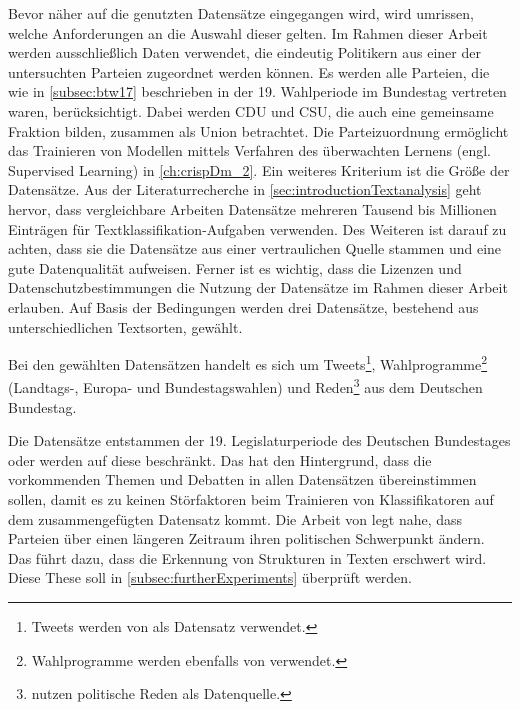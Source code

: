 Bevor näher auf die genutzten Datensätze eingegangen wird, wird umrissen, welche Anforderungen an die Auswahl dieser gelten. Im Rahmen dieser Arbeit werden ausschließlich Daten verwendet, die eindeutig Politikern aus einer der untersuchten Parteien zugeordnet werden können. Es werden alle Parteien, die wie in \autoref{subsec:btw17} beschrieben in der \num{19}. Wahlperiode im Bundestag vertreten waren, berücksichtigt. Dabei werden \ac{CDU} und \ac{CSU}, die auch eine gemeinsame Fraktion bilden, zusammen als Union betrachtet. Die Parteizuordnung ermöglicht das Trainieren von Modellen mittels Verfahren des überwachten Lernens (engl. Supervised Learning) in \autoref{ch:crispDm_2}. Ein weiteres Kriterium ist die Größe der Datensätze. Aus der Literaturrecherche in \autoref{sec:introductionTextanalysis} geht hervor, dass vergleichbare Arbeiten Datensätze mehreren Tausend bis Millionen Einträgen für Textklassifikation-Aufgaben verwenden. Des Weiteren ist darauf zu achten, dass sie die Datensätze aus einer vertraulichen Quelle stammen und eine gute Datenqualität aufweisen. Ferner ist es wichtig, dass die Lizenzen und Datenschutzbestimmungen die Nutzung der Datensätze im Rahmen dieser Arbeit erlauben. Auf Basis der Bedingungen werden drei Datensätze, bestehend aus unterschiedlichen Textsorten, gewählt. 

Bei den  gewählten Datensätzen handelt es sich um Tweets\footnote{Tweets werden von \textcite{saltzer_bundestagswahl_2022, saltzer_finding_2022, guhr_training_2020, wong_quantifying_2016} als Datensatz verwendet.}, Wahlprogramme\footnote{Wahlprogramme werden ebenfalls von \textcite{biessmann_predicting_2016} verwendet.} (Landtags-, Europa- und Bundestagswahlen) und Reden\footnote{\textcite{doan_using_2022, biessmann_predicting_2016, simoes_fine-tuned_2020} nutzen politische Reden als Datenquelle.} aus dem Deutschen Bundestag.

Die Datensätze entstammen der 19. Legislaturperiode des Deutschen Bundestages oder werden auf diese beschränkt. Das hat den Hintergrund, dass die vorkommenden Themen und Debatten in allen Datensätzen übereinstimmen sollen, damit es zu keinen Störfaktoren beim Trainieren von Klassifikatoren auf dem zusammengefügten Datensatz kommt. Die Arbeit von \textcite{richter_open_2021} legt nahe, dass Parteien über einen längeren Zeitraum ihren politischen Schwerpunkt ändern. Das führt dazu, dass die Erkennung von Strukturen in Texten erschwert wird. Diese These soll in \autoref{subsec:furtherExperiments} überprüft werden.


